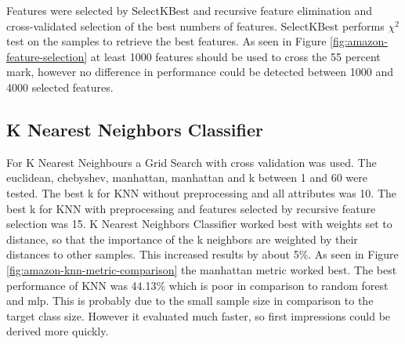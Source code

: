 Features were selected by SelectKBest and recursive feature elimination and cross-validated selection of the best numbers of features.
SelectKBest performs ${\chi}^2$ test on the samples to retrieve the best features.
As seen in Figure \ref{fig:amazon-feature-selection} at least 1000 features should be used to cross the 55 percent mark, however no difference in performance could be detected between 1000 and 4000 selected features.



\subsection{K Nearest Neighbors Classifier}

For K Nearest Neighbours a Grid Search with cross validation was used. The euclidean, chebyshev, manhattan, manhattan and k between 1 and 60 were tested. 
The best k for KNN without preprocessing and all attributes was 10.
The best k for KNN with preprocessing and features selected by recursive feature selection was 15.
K Nearest Neighbors Classifier worked best with weights set to distance, so that the importance of the k neighbors are weighted by their distances to other samples.
This increased results by about 5\%. As seen in Figure \ref{fig:amazon-knn-metric-comparison} the manhattan metric worked best.
The best performance of KNN was 44.13\% which is poor in comparison to random forest and mlp.
This is probably due to the small sample size in comparison to the target class size.
However it evaluated much faster, so first impressions could be derived more quickly.



